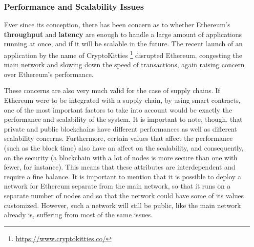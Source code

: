 

\subsubsection{Performance and Scalability Issues}



Ever since its conception, there has been concern as to whether Ethereum's \textbf{throughput} and \textbf{latency} are enough to handle a large amount of applications running at once, and if it will be scalable in the future. The recent launch of an application by the name of CryptoKitties \footnote{\url{https://www.cryptokitties.co/}} disrupted Ethereum, congesting the main network and slowing down the speed of transactions, again raising concern over Ethereum's performance.

These concerns are also very much valid for the case of supply chains. If Ethereum were to be integrated with a supply chain, by using smart contracts, one of the most important factors to take into account would be exactly the performance and scalability of the system. It is important to note, though, that private and public blockchains have different performances as well as different scalability concerns. Furthermore, certain values that affect the performance (such as the block time) also have an affect on the scalability, and consequently, on the security (a blockchain with a lot of nodes is more secure than one with fewer, for instance). This means that these attributes are interdependent and require a fine balance. It is important to mention that it is possible to deploy a network for Ethereum separate from the main network, so that it runs on a separate number of nodes and so that the network could have some of its values customized. However, such a network will still be public, like the main network already is, suffering from most of the same issues.

